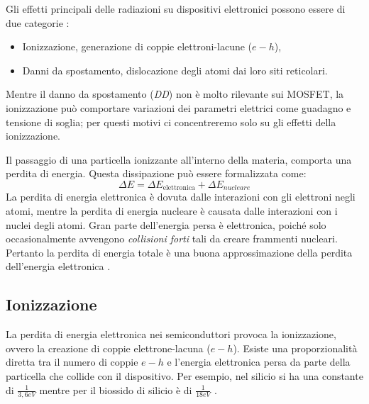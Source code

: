
Gli effetti principali delle radiazioni su dispositivi elettronici possono essere di due categorie \cite{bib:Effetti_Radiazioni_1987}:
\begin{itemize}
	\item Ionizzazione, generazione di coppie elettroni-lacune ($e-h$),
	\item Danni da spostamento, dislocazione degli atomi dai loro siti reticolari.
\end{itemize}
Mentre il danno da spostamento (\textit{DD}) non è molto rilevante sui MOSFET, la ionizzazione può comportare variazioni dei parametri elettrici come guadagno e tensione di soglia; per questi motivi ci concentreremo solo su gli effetti della ionizzazione.

\vspace{0.5cm}

Il passaggio di una particella ionizzante all'interno della materia, comporta una perdita di energia. Questa dissipazione può essere formalizzata come:
$$ \Delta E = \Delta E_{\text{elettronica}} + \Delta E_{nucleare} $$
La perdita di energia elettronica è dovuta dalle interazioni con gli elettroni negli atomi, mentre la perdita di energia nucleare è causata dalle interazioni con i nuclei degli atomi.
Gran parte dell'energia persa è elettronica, poiché solo occasionalmente avvengono \textit{collisioni forti} tali da creare frammenti nucleari. Pertanto la perdita di energia totale è una buona approssimazione della perdita dell'energia elettronica \cite{bib:Effetti_Radiazioni_NASA}.

\vspace{0.5cm}

\subsection{Ionizzazione}\label{cap1:ionizzazione}
La perdita di energia elettronica  nei semiconduttori provoca la ionizzazione, ovvero la creazione di coppie elettrone-lacuna ($e-h$). Esiste una proporzionalità diretta tra il numero di coppie $e-h$ e l'energia elettronica persa da parte della particella che collide con il dispositivo. Per esempio, nel silicio si ha una constante di $\frac{1}{3,6eV}$ mentre per il biossido di silicio è di $\frac{1}{18eV}$ \cite{bib:Effetti_Radiazioni_NASA}.

\vspace{0.5cm}

